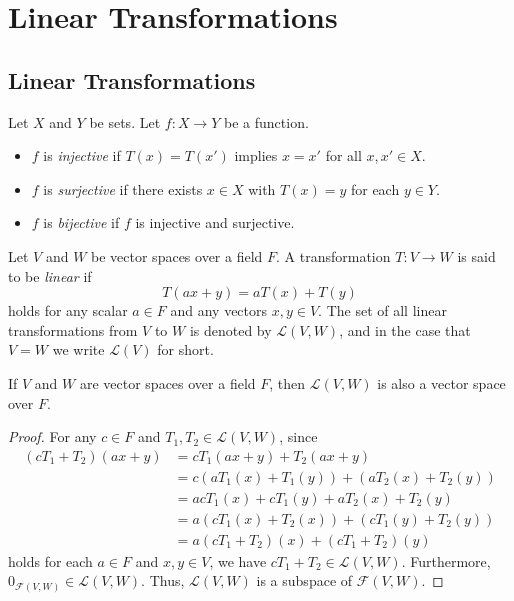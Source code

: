 \chapter{Linear Transformations}
\section{Linear Transformations}
\begin{definition}
  \label{def:bijection}
  Let $X$ and $Y$ be sets.
  Let $f: X \to Y$ be a function.
  \begin{itemize}
    \item $f$ is \emph{injective} if $T(x) = T(x')$ implies $x = x'$
    for all $x, x' \in X$.
    \item $f$ is \emph{surjective} if there exists $x \in X$ with $T(x) = y$
    for each $y \in Y$.
    \item $f$ is \emph{bijective} if $f$ is injective and surjective.
  \end{itemize}
\end{definition}

\begin{definition}
  \label{def:linear-transformation}
  Let $V$ and $W$ be vector spaces over a field $F$.
  A transformation $T: V \to W$ is said to be \emph{linear} if
  \begin{equation*}
    T(ax + y) = aT(x) + T(y)
  \end{equation*}
  holds for any scalar $a \in F$ and any vectors $x, y \in V$.
  The set of all linear transformations from $V$ to $W$ is denoted by
  $\mathcal{L}(V, W)$, and in the case that $V = W$ we write $\mathcal{L}(V)$
  for short.
\end{definition}

\begin{theorem}
  \label{thm:linear-transformation-space}
  If $V$ and $W$ are vector spaces over a field $F$, then $\mathcal{L}(V, W)$
  is also a vector space over $F$.
\end{theorem}
\begin{proof}
  For any $c \in F$ and $T_1, T_2 \in \mathcal{L}(V, W)$, since
  \begin{align*}
    (cT_1 + T_2)(ax + y)
    &= cT_1(ax + y) + T_2(ax + y) \tag{linearity of $cT_1 + T_2$} \\
    &= c(aT_1(x) + T_1(y)) + (aT_2(x) + T_2(y)) \tag{linearity of $T_1$ and $T_2$} \\
    &= acT_1(x) + cT_1(y) + aT_2(x) + T_2(y) \\
    &= a(cT_1(x) + T_2(x)) + (cT_1(y) + T_2(y)) \\
    &= a(cT_1 + T_2)(x) + (cT_1 + T_2)(y) \tag{linearity of $cT_1 + T_2$}
  \end{align*}
  holds for each $a \in F$ and $x, y \in V$,
  we have $cT_1 + T_2 \in \mathcal{L}(V, W)$.
  Furthermore, $0_{\mathcal{F}(V, W)} \in \mathcal{L}(V, W)$.
  Thus, $\mathcal{L}(V, W)$ is a subspace of $\mathcal{F}(V, W)$.
\end{proof}

